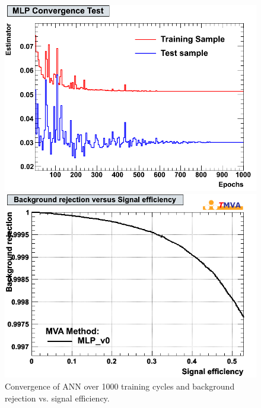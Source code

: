 \documentclass[a4paper]{jpconf}
\begin{document}
\begin{figure}[h]
 \begin{minipage}{7.5cm}
\includegraphics[width=1.0\textwidth]{images/MLPConvergenceTest.png}
\end{minipage}
 \hfill
\begin{minipage}{7.5cm}

\includegraphics[width=1.0\textwidth]{images/roc.png}
\end{minipage}
\caption{Convergence of ANN over 1000 training cycles and background rejection vs. signal efficiency.}
\label{fig:nn}
\end{figure}
\end{document}
